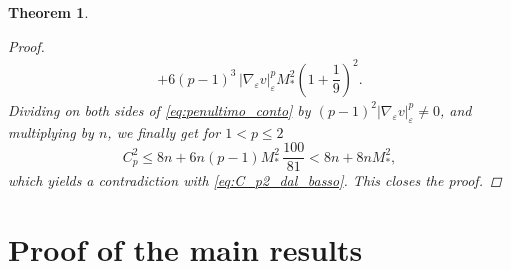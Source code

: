 \documentclass[10pt]{amsart}
\numberwithin{equation}{section}
\newtheorem{theorem}{Theorem}[section]
\theoremstyle{definition}
\newcommand{\eps}{\varepsilon}
\newcommand{\egrad}{\nabla_{\eps}}
\newcommand{\enorm}[1]{\|{#1}\|_{\eps}}
\begin{document}
\begin{theorem}
\begin{proof}
\begin{equation}
\begin{aligned}
				+ 6(p-1)^3 \, |\nabla_{\varepsilon}v|_{\varepsilon}^{p} M_{\ast}^{2} \left(1+\dfrac{1}{9}\right)^2.
			\end{aligned}
		\end{equation}
		Dividing on both sides of \eqref{eq:penultimo_conto} by $(p-1)^2|\nabla_{\varepsilon}v|_{\varepsilon}^{p}\neq 0$, and multiplying by $n$, we finally get for $1<p\leq 2$
		\begin{equation*}
			C_{p}^{2} \leq 8n + 6n(p-1)M_{\ast}^2 \, \dfrac{100}{81} < 8n + 8n M_{\ast}^2,
		\end{equation*}
		\noindent which yields a contradiction with \eqref{eq:C_p2_dal_basso}. This closes the proof.
	\end{proof}
\end{theorem}




\section{Proof of the main results}
\end{document}
